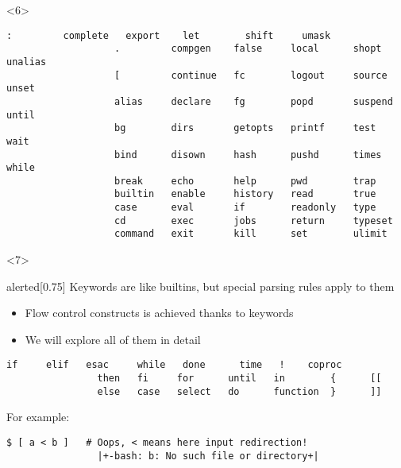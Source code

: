 \begin{frame}
\begin{overlayarea}{\textwidth}{0.7\textheight}
\begin{onlyenv}
\begin{onlyenv}
            \end{onlyenv}
            \begin{onlyenv}<6>
                \begin{lstlisting}[style=MyBash, numbers=none]
                   :         complete   export    let        shift     umask  
                   .         compgen    false     local      shopt     unalias
                   [         continue   fc        logout     source    unset  
                   alias     declare    fg        popd       suspend   until  
                   bg        dirs       getopts   printf     test      wait   
                   bind      disown     hash      pushd      times     while  
                   break     echo       help      pwd        trap      
                   builtin   enable     history   read       true      
                   case      eval       if        readonly   type      
                   cd        exec       jobs      return     typeset   
                   command   exit       kill      set        ulimit    
                \end{lstlisting}
            \end{onlyenv}
        \end{onlyenv}
        \begin{onlyenv}<7>
            \begin{varblock}{alerted}[0.75\textwidth]{}
                Keywords are like builtins, but \alert{special parsing rules apply to them}
            \end{varblock}
            \begin{itemize}
                \item Flow control constructs is achieved thanks to keywords
                \item We will explore all of them in detail 
            \end{itemize}
            \begin{lstlisting}[style=MyBash, numbers=none]
                if     elif   esac     while   done      time   !    coproc
                then   fi     for      until   in        {      [[
                else   case   select   do      function  }      ]]
            \end{lstlisting}
            \bigskip
            For example:
            \medskip
            \begin{lstlisting}[style=MyBash]
                $ [ a < b ]   # Oops, < means here input redirection!
                |+-bash: b: No such file or directory+|

\end{lstlisting}
\end{onlyenv}
\end{overlayarea}
\end{frame}
